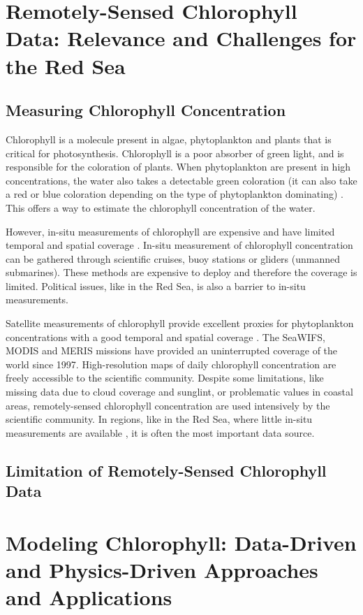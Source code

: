 \section{Remotely-Sensed Chlorophyll Data: Relevance and Challenges for the Red
Sea}

\subsection{Measuring Chlorophyll Concentration}

Chlorophyll is a molecule present in algae, phytoplankton and plants that is critical for photosynthesis. Chlorophyll is a poor absorber of green light, and is responsible for the coloration of plants. When phytoplankton are present in high concentrations, the water also takes a detectable green coloration (it can also take a red or blue coloration depending on the type of phytoplankton dominating) \cite{Robinson2010}. This offers a way to estimate the chlorophyll concentration of the water.

However, in-situ measurements of chlorophyll are expensive and have limited temporal and spatial coverage \cite{Robinson2010}. In-situ measurement of chlorophyll concentration can be gathered through scientific cruises, buoy stations or gliders (unmanned submarines). These methods are expensive to deploy and therefore the coverage is limited. Political issues, like in the Red Sea, is also a barrier to in-situ measurements.

Satellite measurements of chlorophyll provide excellent proxies for phytoplankton concentrations with a good temporal and spatial coverage \cite{Robinson2010}. The SeaWIFS, MODIS and MERIS missions have provided an uninterrupted coverage of the world since 1997. High-resolution maps of daily chlorophyll concentration are freely accessible to the scientific community. Despite some limitations, like missing data due to cloud coverage and sunglint, or problematic values in coastal areas, remotely-sensed chlorophyll concentration are used intensively by the scientific community. In regions, like in the Red Sea, where little in-situ measurements are available \cite{Raitsos2013}, it is often the most important data source.

\subsection{Limitation of Remotely-Sensed Chlorophyll Data}

\section{Modeling Chlorophyll: Data-Driven and Physics-Driven Approaches and 
Applications}

